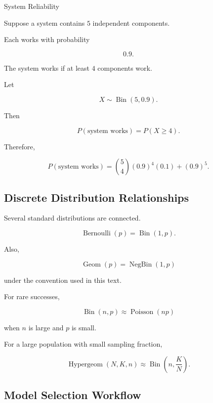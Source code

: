 \begin{workedexamplebox}{System Reliability}

Suppose a system contains \(5\) independent components.

Each works with probability

\[
0.9.
\]

The system works if at least \(4\) components work.

Let

\[
X\sim\operatorname{Bin}(5,0.9).
\]

Then

\[
P(\text{system works})
=
P(X\geq4).
\]

Therefore,

\begin{answerbox}
\[
\boxed{
P(\text{system works})
=
\binom54
(0.9)^4(0.1)
+
(0.9)^5.
}
\]
\end{answerbox}

\end{workedexamplebox}

\subsection{Discrete Distribution Relationships}
\label{subsec:discrete-distribution-relationships}

Several standard distributions are connected.

\[
\boxed{
\operatorname{Bernoulli}(p)
=
\operatorname{Bin}(1,p).
}
\]

Also,

\[
\boxed{
\operatorname{Geom}(p)
=
\operatorname{NegBin}(1,p)
}
\]

under the convention used in this text.

For rare successes,

\[
\boxed{
\operatorname{Bin}(n,p)
\approx
\operatorname{Poisson}(np)
}
\]

when \(n\) is large and \(p\) is small.

For a large population with small sampling fraction,

\[
\boxed{
\operatorname{Hypergeom}(N,K,n)
\approx
\operatorname{Bin}
\left(
n,\frac KN
\right).
}
\]

\subsection{Model Selection Workflow}
\label{subsec:discrete-model-selection-workflow}

